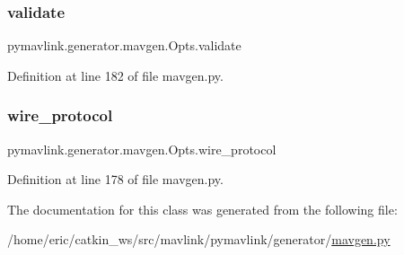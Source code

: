 \mbox{\label{classpymavlink_1_1generator_1_1mavgen_1_1Opts_a44cf03993910729c1748cce06e909e06}} 
\subsubsection{\texorpdfstring{validate}{validate}}
{\footnotesize\ttfamily pymavlink.\+generator.\+mavgen.\+Opts.\+validate}



Definition at line 182 of file mavgen.\+py.

\mbox{\label{classpymavlink_1_1generator_1_1mavgen_1_1Opts_af1a93e2fc4904c4e01985743105599f3}} 
\subsubsection{\texorpdfstring{wire\_protocol}{wire\_protocol}}
{\footnotesize\ttfamily pymavlink.\+generator.\+mavgen.\+Opts.\+wire\+\_\+protocol}



Definition at line 178 of file mavgen.\+py.



The documentation for this class was generated from the following file\+:\begin{DoxyCompactItemize}
\item 
/home/eric/catkin\+\_\+ws/src/mavlink/pymavlink/generator/\mbox{\hyperlink{generator_2mavgen_8py}{mavgen.\+py}}\end{DoxyCompactItemize}
